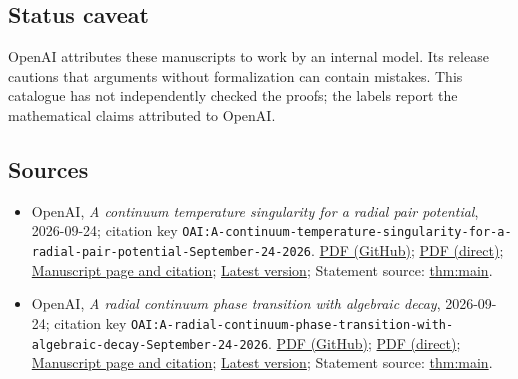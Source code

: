 \documentclass[11pt]{article}
\begin{document}
\subsection{Status caveat}
OpenAI attributes these manuscripts to work by an internal model. Its release cautions that arguments without formalization can contain mistakes. This catalogue has not independently checked the proofs; the labels report the mathematical claims attributed to OpenAI.

\subsection{Sources}
\begin{itemize}
\item OpenAI, \emph{A continuum temperature singularity for a radial pair potential}, 2026-09-24; citation key \texttt{OAI:A-continuum-temperature-singularity-for-a-radial-pair-potential-September-24-2026}. \href{https://github.com/openai/math/blob/adc7f1241b42e322a6451854ab7e4b4c146bf78a/preprints/A-continuum-temperature-singularity-for-a-radial-pair-potential-September-24-2026/paper.pdf}{PDF (GitHub)}; \href{https://github.com/openai/math/raw/adc7f1241b42e322a6451854ab7e4b4c146bf78a/preprints/A-continuum-temperature-singularity-for-a-radial-pair-potential-September-24-2026/paper.pdf}{PDF (direct)}; \href{https://github.com/openai/math/blob/adc7f1241b42e322a6451854ab7e4b4c146bf78a/preprints/A-continuum-temperature-singularity-for-a-radial-pair-potential-September-24-2026/README.md}{Manuscript page and citation}; \href{https://github.com/openai/math/blob/main/preprints/A-continuum-temperature-singularity-for-a-radial-pair-potential-September-24-2026/paper.pdf}{Latest version}; Statement source: \href{https://github.com/openai/math/blob/adc7f1241b42e322a6451854ab7e4b4c146bf78a/preprints/A-continuum-temperature-singularity-for-a-radial-pair-potential-September-24-2026/build/introduction.tex\#L44}{thm:main}.
\item OpenAI, \emph{A radial continuum phase transition with algebraic decay}, 2026-09-24; citation key \texttt{OAI:A-radial-continuum-phase-transition-with-algebraic-decay-September-24-2026}. \href{https://github.com/openai/math/blob/adc7f1241b42e322a6451854ab7e4b4c146bf78a/preprints/A-radial-continuum-phase-transition-with-algebraic-decay-September-24-2026/paper.pdf}{PDF (GitHub)}; \href{https://github.com/openai/math/raw/adc7f1241b42e322a6451854ab7e4b4c146bf78a/preprints/A-radial-continuum-phase-transition-with-algebraic-decay-September-24-2026/paper.pdf}{PDF (direct)}; \href{https://github.com/openai/math/blob/adc7f1241b42e322a6451854ab7e4b4c146bf78a/preprints/A-radial-continuum-phase-transition-with-algebraic-decay-September-24-2026/README.md}{Manuscript page and citation}; \href{https://github.com/openai/math/blob/main/preprints/A-radial-continuum-phase-transition-with-algebraic-decay-September-24-2026/paper.pdf}{Latest version}; Statement source: \href{https://github.com/openai/math/blob/adc7f1241b42e322a6451854ab7e4b4c146bf78a/preprints/A-radial-continuum-phase-transition-with-algebraic-decay-September-24-2026/build/sections/introduction.tex\#L32}{thm:main}.

\end{itemize}
\end{document}
